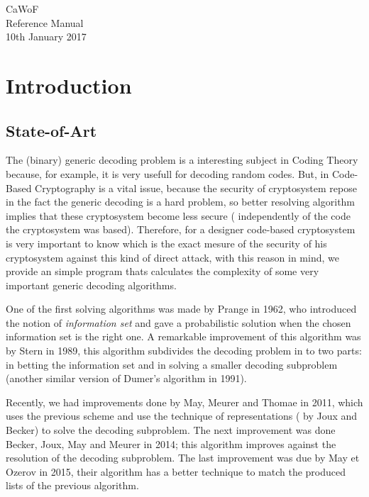 \documentclass[a4paper]{book}
\begin{document}
\hypersetup{pageanchor=false,citecolor=blue}
\begin{titlepage}
\vspace*{7cm}
\begin{center}
{\LARGE \-Ca\-Wo\-F }\\
\vspace*{1cm}
{\Large \-Reference Manual}\\
\vspace*{0.5cm}
{\large 10th January 2017 }\\
\end{center}
\end{titlepage}
\clearemptydoublepage
{}
\tableofcontents
\clearemptydoublepage
{}
\hypersetup{pageanchor=true,citecolor=blue}
\chapter{Introduction}
\section{State-of-Art}
The (binary) generic decoding problem is a interesting subject in Coding Theory because, for example, it is very usefull for decoding random codes. But, in  Code-Based Cryptography is a vital issue, because the security of cryptosystem repose in the fact the generic decoding is a hard problem, so better resolving algorithm implies that these cryptosystem become less secure ( independently of the code the cryptosystem was based). Therefore, for a designer code-based cryptosystem is very important to know which is the exact mesure of the security of his cryptosystem against this kind of direct attack, with this reason in mind, we provide an simple program thats calculates the complexity of some very important generic decoding algorithms.

One of the first solving algorithms was made by Prange in 1962, who introduced the notion of \emph{information set} and gave a probabilistic solution when the chosen information set is the right one. A remarkable improvement of this algorithm was by Stern in 1989, this algorithm subdivides the decoding problem in to two parts: in betting the information set and in solving a smaller decoding subproblem (another similar version of Dumer's algorithm in 1991). 

Recently, we had improvements done by May, Meurer and Thomae in 2011, which uses the previous scheme and use the technique of representations ( by Joux and Becker) to solve the decoding subproblem. The next improvement was done Becker, Joux, May and Meurer in 2014; this algorithm improves against the resolution of the decoding subproblem. The last improvement was due by May et Ozerov in 2015, their algorithm has a better technique to match the produced lists of the previous algorithm. 
\end{document}
